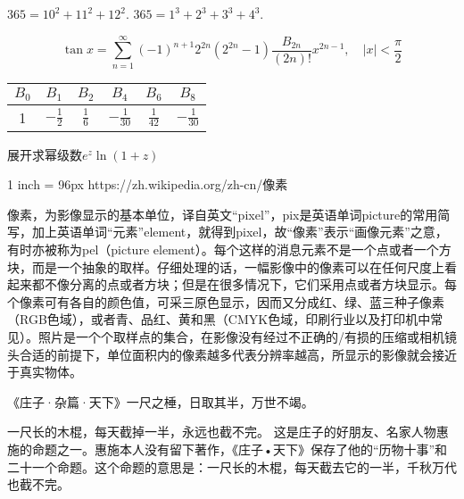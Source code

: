 

$365=10^2+11^2+12^2$.
$365=1^3+2^3+3^3+4^3$.

$$\tan x = \sum_{n=1}^\infty (-1)^{n+1}2^{2n}(2^{2n}-1)\frac{B_{2n}}{(2n)!}x^{2n-1}, 
\quad |x|<\frac{\pi}2$$


\begin{tabular}{cccccc}
	\hline
	$B_0$  & 	$B_1$ &	$B_2$ &$B_4$ & $B_6$ & $B_8$ \\
	\hline
	1 & $-\frac{1}{2}$  & $\frac{1}{6}$ &$-\frac{1}{30}$ & $\frac{1}{42}$& $-\frac{1}{30}$\\
	\hline
\end{tabular}


展开求幂级数$e^z\ln(1+z)$

1 inch = 96px
https://zh.wikipedia.org/zh-cn/像素

像素，为影像显示的基本单位，译自英文“pixel”，pix是英语单词picture的常用简写，加上英语单词“元素”element，就得到pixel，故“像素”表示“画像元素”之意，有时亦被称为pel（picture element）。每个这样的消息元素不是一个点或者一个方块，而是一个抽象的取样。仔细处理的话，一幅影像中的像素可以在任何尺度上看起来都不像分离的点或者方块；但是在很多情况下，它们采用点或者方块显示。每个像素可有各自的颜色值，可采三原色显示，因而又分成红、绿、蓝三种子像素（RGB色域），或者青、品红、黄和黑（CMYK色域，印刷行业以及打印机中常见）。照片是一个个取样点的集合，在影像没有经过不正确的/有损的压缩或相机镜头合适的前提下，单位面积内的像素越多代表分辨率越高，所显示的影像就会接近于真实物体。


《庄子·杂篇·天下》一尺之棰，日取其半，万世不竭。

一尺长的木棍，每天截掉一半，永远也截不完。
这是庄子的好朋友、名家人物惠施的命题之一。惠施本人没有留下著作，《庄子•天下》保存了他的“历物十事”和二十一个命题。这个命题的意思是：一尺长的木棍，每天截去它的一半，千秋万代也截不完。


